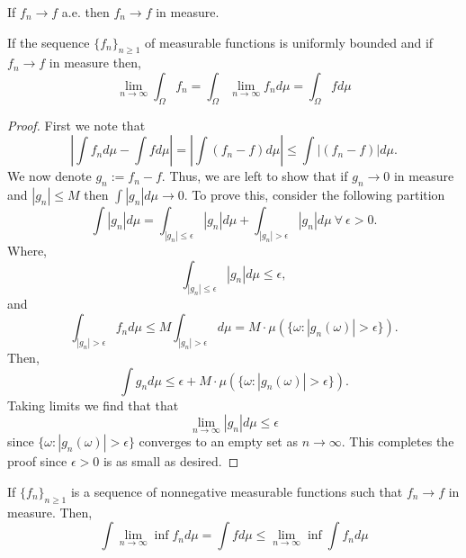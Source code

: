 \documentclass[../TGMAFFIRO.tex]{subfiles}
\begin{document}

\begin{proposition} \label{prop:convergence_ae_measure}
	If $f_n \to f$ a.e. then $f_n \to f$ in measure.
\end{proposition}

\begin{theorem}
	If the sequence $\{f_n\}_{n\geq 1}$ of measurable functions is uniformly bounded and if $f_n \to f$ in measure then,
	\begin{equation}
		\lim_{n\to\infty} \int_\Omega f_n = 	\int_\Omega \lim_{n\to\infty} f_n d\mu = \int_\Omega f d\mu
	\end{equation}
\end{theorem}

\begin{proof}
	First we note that
	\[
		|\int f_n d\mu - \int f d\mu| = |\int (f_n - f) d\mu| \leq \int| (f_n - f) | d\mu.
	\]
	We now denote $g_n := f_n - f$. Thus, we are left to show that if $g_n \to 0$ in measure and $|g_n| \leq M$ then $\int |g_n| d\mu \to 0$. To prove this, consider the following partition
	\[
		\int|g_n| d\mu = \int_{|g_n| \leq \epsilon}|g_n| d\mu + \int_{|g_n| > \epsilon}|g_n| d\mu \ \forall \ \epsilon > 0.
	\]
	Where,
	\[
		\int_{|g_n| \leq \epsilon} |g_n| d\mu \leq \epsilon,
	\]
	and
	\[
		\int_{|g_n| > \epsilon} f_n d\mu \leq M\int_{|g_n| > \epsilon} d\mu = M\cdot\mu(\{\omega : |g_n(\omega)| > \epsilon\}).
	\]
	Then,
	\begin{equation}
		\int g_n d\mu \leq \epsilon + M\cdot\mu(\{\omega : |g_n(\omega)| > \epsilon\}).
	\end{equation}
	Taking limits we find that that
	\[
		\lim_{n\to\infty} |g_n| d\mu \leq \epsilon
	\]
	since $\{\omega : |g_n(\omega)| > \epsilon\}$ converges to an empty set as $n\to\infty$. This completes the proof since $\epsilon > 0$ is as small as desired.
\end{proof}

\begin{theorem}\label{th:fatous_lemma}
If $\{f_n\}_{n\geq 1}$ is a sequence of nonnegative measurable functions such that $f_n \to f$ in measure. Then,
\begin{equation}
	\int\lim_{n\to\infty}\inf f_n d\mu = \int f d\mu \leq \lim_{n\to\infty}\inf\int f_n d\mu
\end{equation}
\end{theorem}
\end{document}
